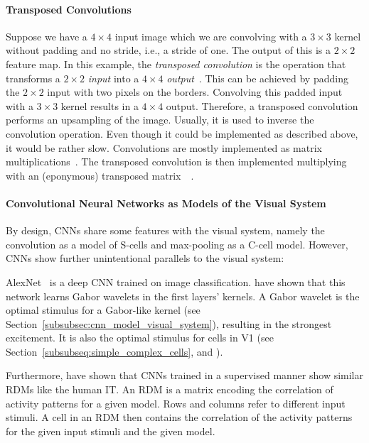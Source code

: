 \paragraph{Transposed Convolutions}
Suppose we have a $4\times 4$ input image which we are convolving with a $3\times 3$ kernel without padding and no stride, i.e., a stride of one.
The output of this is a $2\times 2$ feature map.
In this example, the \textit{transposed convolution} is the operation that transforms a $2\times 2$ \textit{input} into a $4\times 4$ \textit{output}~\citep{dumoulin2016guide}.
This can be achieved by padding the $2\times 2$ input with two pixels on the borders.
Convolving this padded input with a $3\times 3$ kernel results in a $4\times 4$ output.
Therefore, a transposed convolution performs an upsampling of the image.
Usually, it is used to inverse the convolution operation.
Even though it could be implemented as described above, it would be rather slow.
Convolutions are mostly implemented as matrix multiplications~\citep{georganas2018anatomy}.
The transposed convolution is then implemented multiplying with an (eponymous) transposed matrix~~\citep{dumoulin2016guide}.

\paragraph{Convolutional Neural Networks as Models of the Visual System}
By design, \acp{CNN} share some features with the visual system, namely the convolution as a model of S-cells and max-pooling as a C-cell model.
However, \acp{CNN} show further unintentional parallels to the visual system:

AlexNet~\citep{krizhevsky2012imagenet} is a deep \ac{CNN} trained on image classification.
\citet{krizhevsky2012imagenet} have shown that this network learns Gabor wavelets in the first layers' kernels.
A Gabor wavelet is the optimal stimulus for a Gabor-like kernel (see Section~\ref{subsubsec:cnn_model_visual_system}), resulting in the strongest excitement.
It is also the optimal stimulus for cells in \ac{V1} (see Section~\ref{subsubseq:simple_complex_cells}, and \citet{jones1987evaluation}).

Furthermore, \citet{khaligh2014deep} have shown that \acp{CNN} trained in a supervised manner show similar \acp{RDM} like the human \ac{IT}.
An \ac{RDM} is a matrix encoding the correlation of activity patterns for a given model.
Rows and columns refer to different input stimuli.
A cell in an \ac{RDM} then contains the correlation of the activity patterns for the given input stimuli and the given model.

